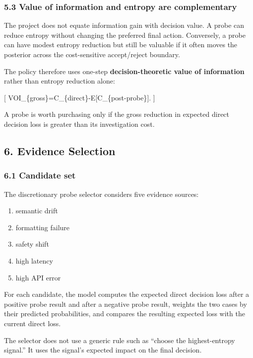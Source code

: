 \documentclass[
]{article}
\providecommand{\tightlist}{%
  \setlength{\itemsep}{0pt}\setlength{\parskip}{0pt}}
\begin{document}
\subsubsection{5.3 Value of information and entropy are
complementary}\label{value-of-information-and-entropy-are-complementary}

The project does not equate information gain with decision value. A
probe can reduce entropy without changing the preferred final action.
Conversely, a probe can have modest entropy reduction but still be
valuable if it often moves the posterior across the cost-sensitive
accept/reject boundary.

The policy therefore uses one-step \textbf{decision-theoretic value of
information} rather than entropy reduction alone:

{[} VOI\_\{gross\}=C\_\{direct\}-E{[}C\_\{post\mbox{-}probe\}{]}. {]}

A probe is worth purchasing only if the gross reduction in expected
direct decision loss is greater than its investigation cost.

\subsection{6. Evidence Selection}\label{evidence-selection}

\subsubsection{6.1 Candidate set}\label{candidate-set}

The discretionary probe selector considers five evidence sources:

\begin{enumerate}
\def\labelenumi{\arabic{enumi}.}
\tightlist
\item
  semantic drift
\item
  formatting failure
\item
  safety shift
\item
  high latency
\item
  high API error
\end{enumerate}

For each candidate, the model computes the expected direct decision loss
after a positive probe result and after a negative probe result, weights
the two cases by their predicted probabilities, and compares the
resulting expected loss with the current direct loss.

The selector does not use a generic rule such as ``choose the
highest-entropy signal.'' It uses the signal's expected impact on the
final decision.
\end{document}
